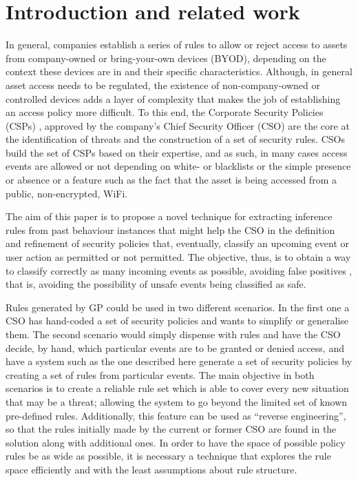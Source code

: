 \documentclass[runningheads]{llncs}
\begin{document}
\section{Introduction and related work}
\label{sec:intro}


In general, companies establish a series of rules to allow or reject
access to assets from company-owned or bring-your-own devices (BYOD),
depending on the context these devices are in and their specific
characteristics. Although, in general asset access needs to be
regulated, the existence of non-company-owned or controlled devices
adds a layer of complexity that makes the job of establishing an
access policy more difficult.
To this end, the Corporate Security Policies (CSPs)
\cite{Kaeo:2003:DNS:1201807}, approved by the company's Chief Security
Officer (CSO) are the core at the identification of threats and the
construction of a set of security rules. CSOs build the
set of CSPs based on their expertise, and as such, in many cases
access events are allowed or not depending on white- or blacklists or
the simple presence or absence or a feature such as the fact that the
asset is being accessed from a public, non-encrypted, WiFi.

The aim of this paper is to propose a novel technique for extracting
inference rules from past behaviour instances 
that might help the CSO in the definition and refinement
of security policies that, eventually, classify an upcoming
event or user action as permitted or not permitted.
The objective, thus, is to obtain a way to classify correctly as many
incoming events as possible, avoiding false positives
\cite{pietraszek2005data}, that is, avoiding the possibility of unsafe
events being classified as safe.

Rules generated by GP could be used
in two different scenarios. In the first one a CSO has hand-coded a set of security
policies and wants to simplify or generalise them. The second scenario 
would simply dispense with rules and have the CSO decide, by hand, which
particular events are to be granted or denied access, and have a system such
as the one described here generate a set of security policies
by creating a set of rules from particular events. 
The main objective in both scenarios is to create a reliable rule set
which is able to cover every new situation that may be a threat;
allowing the system to go beyond the limited set of known pre-defined
rules. Additionally, this feature can be used as ``reverse
engineering'', so that the rules initially made by the current or
former CSO are found in the solution along with additional ones. In
order to have the space of possible policy rules be as wide 
as possible, it is necessary a technique that explores the rule space
efficiently and with the least assumptions about rule structure.
\end{document}
